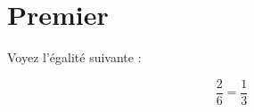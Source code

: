 \documentclass[12pt]{article}
\begin{document}
\section{Premier}

Voyez l'égalité suivante :

$$\frac{2}{6}=\frac{1}{3}$$
\end{document}

